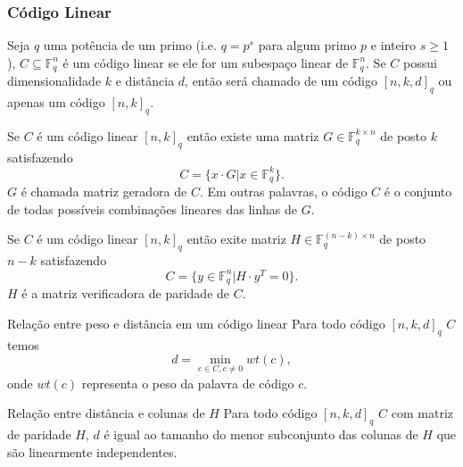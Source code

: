 \begin{frame}[allowframebreaks]
  \frametitle{Código Linear} 
  Seja $q$ uma potência de um primo (i.e. $q=p^s$ para algum primo $p$ e inteiro $s\geq 1$),
  $C \subseteq \mathbb{F}^n_q$ é um código linear se ele for um subespaço linear de $\mathbb{F}^n_q$.
  Se $C$ possui dimensionalidade $k$ e distância $d$, então será chamado de um código $[n,k,d]_q$ ou apenas
  um código $[n,k]_q$.

  \vspace{3ex}
  Se $C$ é um código linear $[n,k]_q$ então existe uma matriz $G \in \mathbb{F}^{k \times n}_q$ de posto $k$ satisfazendo
  \begin{equation}
    C = \{ x \cdot G | x \in \mathbb{F}^k_q \}.
  \end{equation}
  $G$ é chamada matriz geradora de $C$. Em outras palavras, o código $C$ é o conjunto de todas possíveis combinações lineares das linhas de $G$.

  Se $C$ é um código linear $[n,k]_q$ então exite matriz $H \in \mathbb{F}^{(n-k) \times n}_q$ de posto $n-k$ satisfazendo
  \begin{equation}
    C = \{y \in \mathbb{F}^n_q | H \cdot y^T = 0\}.
  \end{equation}
  $H$ é a matriz verificadora de paridade de $C$.


  \framebreak
  \begin{block}{Relação entre peso e distância em um código linear}
    Para todo código $[n,k,d]_q$ $C$ temos
    \begin{equation}
      d = \min_{c\in C, c \neq 0} wt(c),
    \end{equation}
    onde $wt(c)$ representa o peso da palavra de código $c$.
  \end{block}

  \begin{block}{Relação entre distância e colunas de $H$}
    Para todo código $[n,k,d]_q$ $C$ com matriz de paridade $H$, $d$ é igual ao tamanho do menor subconjunto das colunas de $H$ que são linearmente independentes.
  \end{block}

\end{frame}


